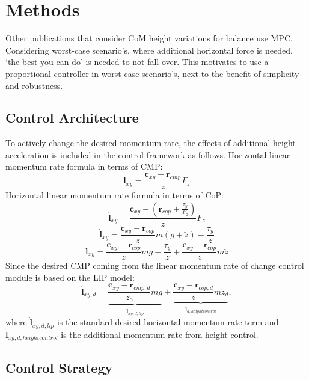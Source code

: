 \section{Methods}
Other publications that consider \ac{CoM} height variations for balance use \ac{MPC}. Considering worst-case scenario's, where additional horizontal force is needed, `the best you can do' is needed to not fall over. This motivates to use a proportional controller in worst case scenario's, next to the benefit of simplicity and robustness.


\subsection{Control Architecture}
To actively change the desired momentum rate, the effects of additional height acceleration is included in the control framework as follows. 
Horizontal linear momentum rate formula in terms of \ac{CMP}:
\begin{equation}
\dot{\mathbf{l}}_{xy}=\frac{\mathbf{c}_{xy}-\mathbf{r}_{cmp}}{z}F_z
\end{equation}
Horizontal linear momentum rate formula in terms of \ac{CoP}:
\begin{equation}
\dot{\mathbf{l}}_{xy}=\frac{\mathbf{c}_{xy}-(\mathbf{r}_{cop}+\frac{\tau_y}{F_z})}{z}F_z
\end{equation}
\begin{equation}
\dot{\mathbf{l}}_{xy}=\frac{\mathbf{c}_{xy}-\mathbf{r}_{cop}}{z}m(g+\ddot{z}) - \frac{\tau_y}{z}
\end{equation}
\begin{equation}
\dot{\mathbf{l}}_{xy}=\frac{\mathbf{c}_{xy}-\mathbf{r}_{cop}}{z}mg - \frac{\tau_y}{z} + \frac{\mathbf{c}_{xy}-\mathbf{r}_{cop}}{z}m\ddot{z}
\end{equation}
 Since the desired \ac{CMP} coming from the linear momentum rate of change control module is based on the \ac{LIP} model:
 \begin{equation}
\dot{\mathbf{l}}_{xy,d}=\underbrace{ \frac{\mathbf{c}_{xy}-\mathbf{r}_{cmp,d}} {z_0}mg}_{\dot{\mathbf{l}}_{xy,d,lip}}  + \underbrace{\frac{\mathbf{c}_{xy}-\mathbf{r}_{cop,d}}{z}m\ddot{z}_d}_{\dot{\mathbf{l}}_{d,heightcontrol}},
\end{equation}
where $\dot{\mathbf{l}}_{xy,d,lip}$ is the standard desired horizontal momentum rate term and $\dot{\mathbf{l}}_{xy,d,heightcontrol}$ is the additional momentum rate from height control.

\subsection{Control Strategy}


